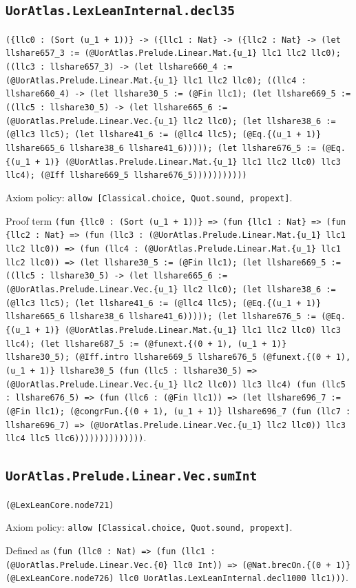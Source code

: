 \documentclass[11pt]{article}
\begin{document}
\subsection*{\texttt{UorAtlas.LexLeanInternal.decl35}}
\noindent\texttt{(\{llc0 : (Sort (u\_1 + 1))\} -> (\{llc1 : Nat\} -> (\{llc2 : Nat\} -> (let llshare657\_3 := (@UorAtlas.Prelude.Linear.Mat.\{u\_1\} llc1 llc2 llc0); ((llc3 : llshare657\_3) -> (let llshare660\_4 := (@UorAtlas.Prelude.Linear.Mat.\{u\_1\} llc1 llc2 llc0); ((llc4 : llshare660\_4) -> (let llshare30\_5 := (@Fin llc1); (let llshare669\_5 := ((llc5 : llshare30\_5) -> (let llshare665\_6 := (@UorAtlas.Prelude.Linear.Vec.\{u\_1\} llc2 llc0); (let llshare38\_6 := (@llc3 llc5); (let llshare41\_6 := (@llc4 llc5); (@Eq.\{(u\_1 + 1)\} llshare665\_6 llshare38\_6 llshare41\_6))))); (let llshare676\_5 := (@Eq.\{(u\_1 + 1)\} (@UorAtlas.Prelude.Linear.Mat.\{u\_1\} llc1 llc2 llc0) llc3 llc4); (@Iff llshare669\_5 llshare676\_5)))))))))))}\par
\noindent Axiom policy: \texttt{allow [Classical.choice, Quot.sound, propext]}.\par
\noindent Proof term \texttt{(fun \{llc0 : (Sort (u\_1 + 1))\} => (fun \{llc1 : Nat\} => (fun \{llc2 : Nat\} => (fun (llc3 : (@UorAtlas.Prelude.Linear.Mat.\{u\_1\} llc1 llc2 llc0)) => (fun (llc4 : (@UorAtlas.Prelude.Linear.Mat.\{u\_1\} llc1 llc2 llc0)) => (let llshare30\_5 := (@Fin llc1); (let llshare669\_5 := ((llc5 : llshare30\_5) -> (let llshare665\_6 := (@UorAtlas.Prelude.Linear.Vec.\{u\_1\} llc2 llc0); (let llshare38\_6 := (@llc3 llc5); (let llshare41\_6 := (@llc4 llc5); (@Eq.\{(u\_1 + 1)\} llshare665\_6 llshare38\_6 llshare41\_6))))); (let llshare676\_5 := (@Eq.\{(u\_1 + 1)\} (@UorAtlas.Prelude.Linear.Mat.\{u\_1\} llc1 llc2 llc0) llc3 llc4); (let llshare687\_5 := (@funext.\{(0 + 1), (u\_1 + 1)\} llshare30\_5); (@Iff.intro llshare669\_5 llshare676\_5 (@funext.\{(0 + 1), (u\_1 + 1)\} llshare30\_5 (fun (llc5 : llshare30\_5) => (@UorAtlas.Prelude.Linear.Vec.\{u\_1\} llc2 llc0)) llc3 llc4) (fun (llc5 : llshare676\_5) => (fun (llc6 : (@Fin llc1)) => (let llshare696\_7 := (@Fin llc1); (@congrFun.\{(0 + 1), (u\_1 + 1)\} llshare696\_7 (fun (llc7 : llshare696\_7) => (@UorAtlas.Prelude.Linear.Vec.\{u\_1\} llc2 llc0)) llc3 llc4 llc5 llc6))))))))))))))}.\par
\subsection*{\texttt{UorAtlas.Prelude.Linear.Vec.sumInt}}
\noindent\texttt{(@LexLeanCore.node721)}\par
\noindent Axiom policy: \texttt{allow [Classical.choice, Quot.sound, propext]}.\par
\noindent Defined as \texttt{(fun (llc0 : Nat) => (fun (llc1 : (@UorAtlas.Prelude.Linear.Vec.\{0\} llc0 Int)) => (@Nat.brecOn.\{(0 + 1)\} (@LexLeanCore.node726) llc0 UorAtlas.LexLeanInternal.decl1000 llc1)))}.\par
\end{document}
